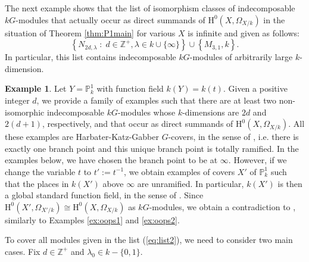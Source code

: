 \documentclass{amsart}
\numberwithin{equation}{section}
\numberwithin{table}{section}
\theoremstyle{plain}
\theoremstyle{definition}
\newtheorem{example}[theorem]{Example}
\theoremstyle{remark}
\newcommand{\HH}{\mathrm{H}}
\begin{document}
The next example shows that the list of isomorphism classes of indecomposable $kG$-modules that actually occur as direct summands of $\HH^0(X,\Omega_{X/k})$ in the situation of Theorem \ref{thm:P1main} for various $X$ is infinite and given as follows:
\begin{equation}
\label{eq:list2}
\left\{N_{2d,\lambda}\;:\;d \in\mathbb{Z}^+, \lambda\in k \cup\{\infty\}\right\} \cup \left\{M_{3,1},k\right\}.
\end{equation}
In particular, this list contains indecomposable $kG$-modules of arbitrarily large $k$-dimension.

\begin{example}
\label{ex:KatzGabber}
Let $Y=\mathbb{P}^1_k$ with function field $k(Y)=k(t)$. Given a positive integer $d$, we provide a family of examples such that there are at least two non-isomorphic indecomposable $kG$-modules whose $k$-dimensions are $2d$ and $2(d+1)$, respectively, and that occur as direct summands of $\HH^0(X,\Omega_{X/k})$. All these examples are Harbater-Katz-Gabber $G$-covers, in the sense of \cite[Section 4.B]{BleherChinburgPoonenSymonds2017}, i.e. there is exactly one branch point and this unique branch point is totally ramified. In the examples below, we have chosen the branch point to be at $\infty$. However, if we change the variable $t$ to $t':=t^{-1}$, we obtain examples of covers $X'$ of $\mathbb{P}^1_k$ such that the places in $k(X')$ above $\infty$ are unramified. 
In particular, $k(X')$ is then a global standard function field, in the sense of \cite[Definitions 2.1 and 3.1]{MarquesWard2018}. Since $\HH^0(X',\Omega_{X'/k})\cong \HH^0(X,\Omega_{X/k})$ as $kG$-modules, we obtain a contradiction to \cite[Theorem 6.4]{MarquesWard2018}, similarly to Examples \ref{ex:oops1} and \ref{ex:oops2}.

To cover all modules given in the list (\ref{eq:list2}), we need to consider two main cases. Fix $d\in\mathbb{Z}^+$ and $\lambda_0\in k-\{0,1\}$.


\end{example}
\end{document}

